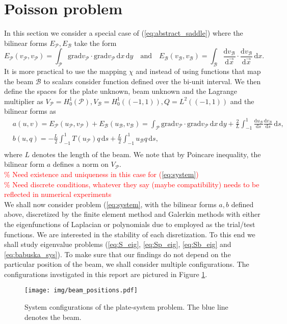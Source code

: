 \documentclass[a4paper,10pt]{article}
\newcommand{\deriv}[2]{\ensuremath{\frac{\mathrm{d}#1}{\mathrm{d}#2}}}
\newcommand{\meas}[1]{\ensuremath{\,\mathrm{d}#1}}
\newcommand{\Grad}[1]{\ensuremath{\text{grad}#1}}
\newcommand{\Vp}{\ensuremath{V_{\mathcal{P}}}}
\newcommand{\Vb}{\ensuremath{V_{\mathcal{B}}}}
\newcommand{\Ep}{\ensuremath{E_{\mathcal{P}}}}
\newcommand{\Eb}{\ensuremath{E_{\mathcal{B}}}}
\newcommand{\up}{\ensuremath{u_{\mathcal{P}}}}
\newcommand{\ub}{\ensuremath{u_{\mathcal{B}}}}
\newcommand{\vp}{\ensuremath{v_{\mathcal{P}}}}
\newcommand{\vb}{\ensuremath{v_{\mathcal{B}}}}
\newcommand{\TODO}[1]{\textcolor{red}{#1}}
\begin{document}
  \section{Poisson problem}
  In this section we consider a special case of (\ref{eq:abstract_saddle}) where
  the bilinear forms $\Ep, \Eb$ take the form
  \[\Ep(\vp,\vp)=\int_\mathcal{P}\Grad{\vp}\cdot\Grad{\vp}\meas{x}\meas{y}
    \quad\text{and}\quad
  \Eb(\vb,\vb)=\int_\mathcal{B}\deriv{\vb}{\vec{x}}\cdot\deriv{\vb}{\vec{x}}\meas{x}.
  \]
  It is more practical to use the mapping $\chi$ and instead of using functions
  that map the beam $\mathcal{B}$ to scalars consider function defined over the
bi-unit interval. We then define the spaces for the plate unknown,
beam unknown and the Lagrange multiplier as 
$\Vp=H^1_0\left(\mathcal{P}\right), \Vb=H^1_0\left(\left(-1, 1\right)\right),
Q=L^2\left(\left(-1, 1\right)\right)$ and the bilinear forms as
\[
  \begin{aligned}
  &a(u, v) = \Ep(\up, \vp) + \Eb(\ub, \vb) = \int_\mathcal{P}\Grad{\vp}\cdot\Grad{\vp}\meas{x}\meas{y}
  + \frac{2}{L}\int_{-1}^{1}\deriv{\ub}{s}\deriv{\vb}{s}\meas{s},\\
  &b(u, q) = -\frac{L}{2}\int_{-1}^{1}T(\up)q\meas{s} +
  \frac{L}{2}\int_{-1}^{1}\ub q\meas{s},\\
  \end{aligned}
\]
where $L$ denotes the length of the beam. We note that by Poincare inequality,
the bilinear form $a$ defines a norm on $\Vp$.\\
\TODO{
\% Need existence and uniqueness in this case for (\ref{eq:system})\\
\% Need discrete conditions, whatever they say (maybe compatibility) needs to
be reflected in numerical experiments\\
}
We shall now consider problem (\ref{eq:system}, with the bilinear forms $a, b$
defined above, discretized by the finite element method and Galerkin methods
with either the eigenfunctions of Laplacian or polynomials due to \cite{shen_leg}
employed as the trial/test functions. We are interested in the stability of each
disretization. To this end we shall study eigenvalue problems (\ref{eq:S_eig},
\ref{eq:Sp_eig}, \ref{eq:Sb_eig} and \ref{eq:babuska_sys}). To make sure that
our findings do not depend on the particular position of the beam, we shall 
consider multiple configurations. The configurations invstigated in this report
are pictured in Figure \ref{fig:beam_positions}.
\begin{figure}
  \begin{center}
    \texttt{[image: img/beam\_positions.pdf]}
  \caption{System configurations of the plate-system problem. The blue line
  denotes the beam.}
  \label{fig:beam_positions}
  \end{center}
\end{figure}
\end{document}
